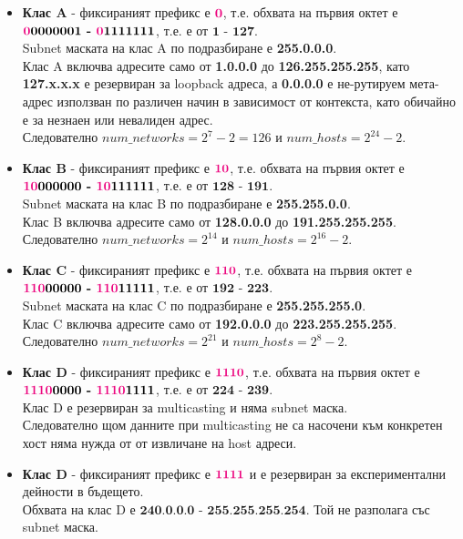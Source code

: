 \documentclass[fleqn,12pt]{article}
\begin{document}
\begin{flushleft}
\begin{itemize}
    \item \textbf{Клас A} - фиксираният префикс е $\textbf{\textcolor{RubineRed}{0}}$, т.е. обхвата на първия октет е $\textbf{\textcolor{RubineRed}{0}0000001 - \textcolor{RubineRed}{0}1111111}$, т.е. е от $\textbf{1 - 127}$. \\
    Subnet маската на клас A по подразбиране е \textbf{255.0.0.0}.\\
    Клас A включва адресите само от \textbf{1.0.0.0} до \textbf{126.255.255.255}, като \textbf{127.x.x.x} е резервиран за loopback адреса, а \textbf{0.0.0.0} е не-рутируем мета-адрес използван по различен начин в зависимост от контекста, като обичайно е за незнаен или невалиден адрес.\\
    Следователно $num\_networks = 2^7 - 2 = 126$ и $num\_hosts = 2^{24} - 2$.
    \item \textbf{Клас B} - фиксираният префикс е $\textbf{\textcolor{RubineRed}{10}}$, т.е. обхвата на първия октет е $\textbf{\textcolor{RubineRed}{10}000000 - \textcolor{RubineRed}{10}111111}$, т.е. е от $\textbf{128 - 191}$. \\
    Subnet маската на клас B по подразбиране е \textbf{255.255.0.0}.\\
    Клас B включва адресите само от \textbf{128.0.0.0} до \textbf{191.255.255.255}.\\
    Следователно $num\_networks = 2^{14}$ и $num\_hosts = 2^{16} - 2$.
    \item \textbf{Клас C} - фиксираният префикс е $\textbf{\textcolor{RubineRed}{110}}$, т.е. обхвата на първия октет е $\textbf{\textcolor{RubineRed}{110}00000 - \textcolor{RubineRed}{110}11111}$, т.е. е от $\textbf{192 - 223}$. \\
    Subnet маската на клас C по подразбиране е \textbf{255.255.255.0}.\\
    Клас C включва адресите само от \textbf{192.0.0.0} до \textbf{223.255.255.255}.\\
    Следователно $num\_networks = 2^{21}$ и $num\_hosts = 2^{8} - 2$.
    \item \textbf{Клас D} - фиксираният префикс е $\textbf{\textcolor{RubineRed}{1110}}$, т.е. обхвата на първия октет е $\textbf{\textcolor{RubineRed}{1110}0000 - \textcolor{RubineRed}{1110}1111}$, т.е. е от $\textbf{224 - 239}$. \\
    Клас D е резервиран за multicasting и няма subnet маска. \\
    Следователно щом данните при multicasting не са насочени към конкретен хост няма нужда от от извличане на host адреси.
    \item \textbf{Клас D} - фиксираният префикс е $\textbf{\textcolor{RubineRed}{1111}}$ и е резервиран за експериментални дейности в бъдещето. \\
    Обхвата на клас D е $\textbf{240.0.0.0 - 255.255.255.254}$. Той не разполага със subnet маска.
\end{itemize}


\end{flushleft}
\end{document}
